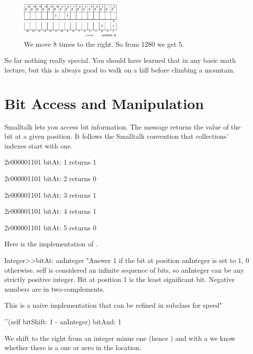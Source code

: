 \documentclass[a4paper,10pt,twoside]{book}
\begin{document}
\begin{figure}[h]
\begin{center}
\includegraphics[width=0.45\textwidth]{16bits-1280shifted8}
\caption{We move 8 times to the right. So from 1280 we get 5.\label{16bits-1280shifted8}}
\end{center}
\end{figure}

So far nothing really special. You should have learned that in any basic math lecture, but this is always good 
to walk on a hill before climbing a mountain.  



\section{Bit Access and Manipulation}
Smalltalk lets you access bit information. The message  returns the value of the bit at a given position. It follows the Smalltalk convention that collections' indexes start with one. 


\begin{code}{}
2r000001101 bitAt: 1
	returns 1 
	
2r000001101 bitAt: 2
	returns 0 
			
2r000001101 bitAt: 3
	returns 1
	
2r000001101 bitAt: 4
	returns 1
	 
2r000001101 bitAt: 5
	returns 0 	 
\end{code}

Here is the implementation of . 

\begin{code}{}
Integer>>bitAt: anInteger
	"Answer 1 if the bit at position anInteger is set to 1, 0 otherwise.
	self is considered an infinite sequence of bits, so anInteger can be any strictly positive integer.
	Bit at position 1 is the least significant bit.
	Negative numbers are in two-complements.
	
	This is a naive implementation that can be refined in subclass for speed"
	
	^(self bitShift: 1 - anInteger) bitAnd: 1
\end{code}

We shift to the right from an integer minus one (hence )
and with a  we know whether there is a one or zero in the location.
\end{document}
